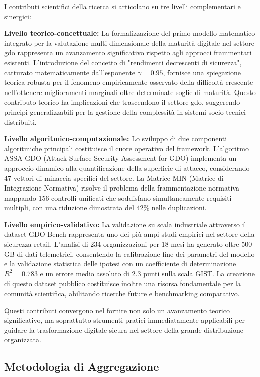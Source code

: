 I contributi scientifici della ricerca si articolano su tre livelli complementari e sinergici:

\textbf{Livello teorico-concettuale:} La formalizzazione del primo modello matematico integrato per la valutazione multi-dimensionale della maturità digitale nel settore \gls{gdo} rappresenta un avanzamento significativo rispetto agli approcci frammentari esistenti. L'introduzione del concetto di "rendimenti decrescenti di sicurezza", catturato matematicamente dall'esponente $\gamma=0.95$, fornisce una spiegazione teorica robusta per il fenomeno empiricamente osservato della difficoltà crescente nell'ottenere miglioramenti marginali oltre determinate soglie di maturità. Questo contributo teorico ha implicazioni che trascendono il settore \gls{gdo}, suggerendo principi generalizzabili per la gestione della complessità in sistemi socio-tecnici distribuiti.

\textbf{Livello algoritmico-computazionale:} Lo sviluppo di due componenti algoritmiche principali costituisce il cuore operativo del framework. L'algoritmo ASSA-GDO (Attack Surface Security Assessment for GDO) implementa un approccio dinamico alla quantificazione della superficie di attacco, considerando 47 vettori di minaccia specifici del settore. 
La Matrice MIN (Matrice di Integrazione Normativa) risolve il problema della frammentazione normativa mappando 156 controlli unificati che soddisfano simultaneamente requisiti multipli, con una riduzione dimostrata del 42\% nelle duplicazioni.

\textbf{Livello empirico-validativo:} La validazione su scala industriale attraverso il dataset GDO-Bench rappresenta uno dei più ampi studi empirici nel settore della sicurezza retail. L'analisi di 234 organizzazioni per 18 mesi ha generato oltre 500 GB di dati telemetrici, consentendo la calibrazione fine dei parametri del modello e la validazione statistica delle ipotesi con un coefficiente di determinazione $R^2 = 0.783$ e un errore medio assoluto di 2.3 punti sulla scala GIST. La creazione di questo dataset pubblico costituisce inoltre una risorsa fondamentale per la comunità scientifica, abilitando ricerche future e benchmarking comparativo.

Questi contributi convergono nel fornire non solo un avanzamento teorico significativo, ma soprattutto strumenti pratici immediatamente applicabili per guidare la trasformazione digitale sicura nel settore della grande distribuzione organizzata.

\subsection{Metodologia di Aggregazione}

